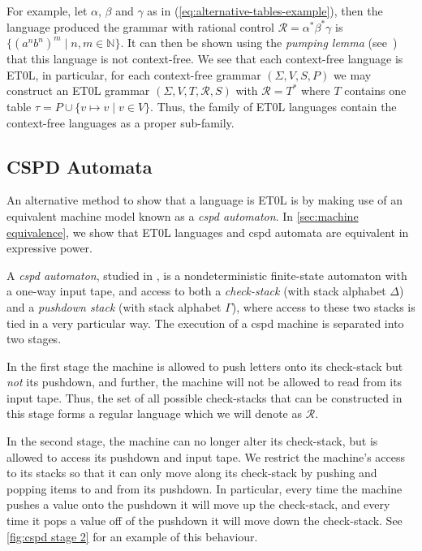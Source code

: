 For example, let $\alpha$, $\beta$ and $\gamma$ as in (\ref{eq:alternative-tables-example}), then the language produced the grammar with rational control $\mathcal{R} = \alpha^* \beta^* \gamma$ is $\{( a^n b^n )^m \mid n,m \in \mathbb{N} \}$.
It can then be shown using the \textit{pumping lemma} (see~\cite[Theorem~2.34]{sipser2013}) that this language is not context-free.
We see that each context-free language is ET0L, in particular, for each context-free grammar $(\Sigma,V,S,P)$ we may construct an ET0L grammar $(\Sigma, V, T, \mathcal{R}, S)$ with $\mathcal{R} = T^*$ where $T$ contains one table
$
	\tau
	=
	P \cup \{v \mapsto v \mid v \in V\}.
$
Thus, the family of ET0L languages contain the context-free languages as a proper sub-family.

\subsection{CSPD Automata}\label{sub:cspd-automata}

An alternative method to show that a language is ET0L is by making use of an equivalent machine model known as a \emph{cspd automaton}.
In \cref{sec:machine equivalence}, we show that ET0L languages and cspd automata are equivalent in expressive power.

A \emph{cspd automaton}, studied in \cite{leeuwen1976}, is a nondeterministic finite-state automaton with a one-way input tape, and access to both a \emph{check-stack} (with stack alphabet $\Delta$) and a \emph{pushdown stack} (with stack alphabet $\Gamma$), where access to these two stacks is tied in a very particular way.
The execution of a cspd machine is separated into two stages.

In the first stage the machine is allowed to push letters onto its check-stack but \textit{not} its pushdown, and further, the machine will not be allowed to read from its input tape.
Thus, the set of all possible check-stacks that can be constructed in this stage forms a regular language which we will denote as $\mathcal{R}$.

In the second stage, the machine can no longer alter its check-stack, but is allowed to access its pushdown and input tape.
We  restrict the machine's access to its stacks so that it can only move along its check-stack by pushing and popping items to and from its pushdown.
In particular, every time the machine pushes a value onto the pushdown it will move up the check-stack, and every time it pops a value off of the pushdown it will move down the check-stack.
See \cref{fig:cspd stage 2} for an example of this behaviour.

